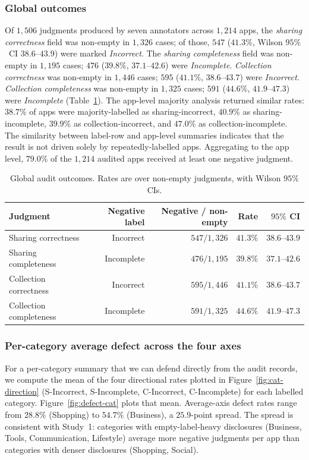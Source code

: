 \documentclass[11pt,a4paper]{article}
\begin{document}
\subsubsection{Global outcomes}
Of $1{,}506$ judgments produced by seven annotators across $1{,}214$
apps, the \emph{sharing correctness} field was non-empty in $1{,}326$
cases; of those, $547$ ($41.3\%$, Wilson $95\%$~CI
$38.6\text{--}43.9$) were marked \emph{Incorrect}. The
\emph{sharing completeness} field was non-empty in $1{,}195$ cases;
$476$ ($39.8\%$, $37.1\text{--}42.6$) were \emph{Incomplete}.
\emph{Collection correctness} was non-empty in $1{,}446$ cases; $595$
($41.1\%$, $38.6\text{--}43.7$) were \emph{Incorrect}.
\emph{Collection completeness} was non-empty in $1{,}325$ cases; $591$
($44.6\%$, $41.9\text{--}47.3$) were \emph{Incomplete}
(Table~\ref{tab:global}). The app-level majority analysis returned
similar rates: $38.7\%$ of apps were majority-labelled as
sharing-incorrect, $40.9\%$ as sharing-incomplete, $39.9\%$ as
collection-incorrect, and $47.0\%$ as collection-incomplete. The
similarity between label-row and app-level summaries indicates that the
result is not driven solely by repeatedly-labelled apps. Aggregating
to the app level, $79.0\%$ of the $1{,}214$ audited apps received at
least one negative judgment.

\begin{table}[t]
\centering\small
\caption{Global audit outcomes. Rates are over non-empty judgments,
with Wilson $95\%$ CIs.}
\label{tab:global}
\begin{tabular}{lrrrr}
\toprule
Judgment & Negative label & Negative / non-empty & Rate & $95\%$ CI \\
\midrule
Sharing correctness     & Incorrect  & $547  / 1{,}326$ & $41.3\%$ & $38.6\text{--}43.9$ \\
Sharing completeness    & Incomplete & $476  / 1{,}195$ & $39.8\%$ & $37.1\text{--}42.6$ \\
Collection correctness  & Incorrect  & $595  / 1{,}446$ & $41.1\%$ & $38.6\text{--}43.7$ \\
Collection completeness & Incomplete & $591  / 1{,}325$ & $44.6\%$ & $41.9\text{--}47.3$ \\
\bottomrule
\end{tabular}
\end{table}

\subsubsection{Per-category average defect across the four axes}
For a per-category summary that we can defend directly from the audit
records, we compute the mean of the four directional rates plotted in
Figure~\ref{fig:cat-direction} (S-Incorrect, S-Incomplete, C-Incorrect,
C-Incomplete) for each labelled category. Figure~\ref{fig:defect-cat}
plots that mean. Average-axis defect rates range from $28.8\%$
(Shopping) to $54.7\%$ (Business), a $25.9$-point spread. The spread
is consistent with Study~1: categories with empty-label-heavy
disclosures (Business, Tools, Communication, Lifestyle) average more
negative judgments per app than categories with denser disclosures
(Shopping, Social).
\end{document}
